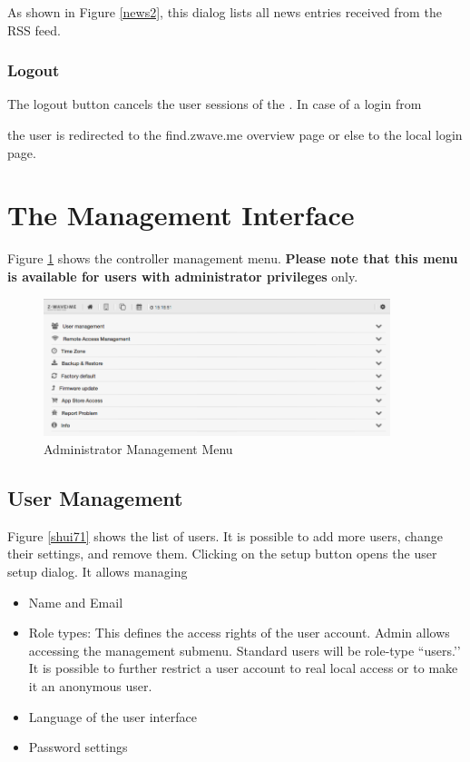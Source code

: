 As shown in Figure \ref{news2}, this dialog lists all news entries received from the RSS feed.

\subsubsection{Logout}

The logout button cancels the user sessions of the \zwshui. In case of 
a login from 



the user is redirected to the find.zwave.me overview page or 
else to the local login page.

\section {The Management Interface}
\label{ManagementInterface}

Figure \ref{shui91} shows the controller management menu. \textbf{Please note that this 
menu is available for users with administrator privileges} only.

\begin{figure}
\begin{center}
\includegraphics[width=0.9\textwidth]{pngs/cap4/shui91.png}
\caption{Administrator Management Menu}
\label{shui91}
\end{center}
\end{figure}

\subsection{User Management}


Figure \ref{shui71} shows the list of users. It is possible to add more users, change 
their settings, and remove them. Clicking on the setup button opens the user setup dialog. 
It allows managing

\begin{itemize}
\item Name and Email
\item Role types: This defines the access rights of the user account. Admin allows 
accessing the management submenu. Standard users will be role-type ``users.’’ It is 
possible to further restrict a user account to real local access or to make it an 
anonymous user.
\item Language of the user interface
\item Password settings
\end{itemize}

